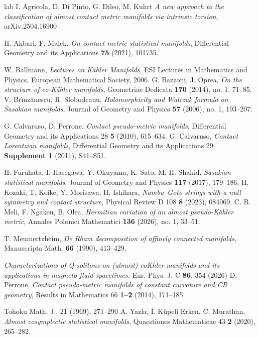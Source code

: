 \documentclass[12pt,a4paper,final]{amsart}
\numberwithin{equation}{section}
\theoremstyle{df}
\begin{document}
\begin{thebibliography}{lab}
{I. Agricola, D. Di Pinto, G. Dileo, M. Kuhrt}{ \emph{A new approach to the classification of almost contact metric manifolds via intrinsic torsion}},{
arXiv:2504.16900}



{H. Akbari, F. Malek},
{\emph{On contact metric statistical manifolds}},
{Differential Geometry and its Applications \textbf{75} (2021)},
{101735}.





{W. Ballmann},
{\emph{Lectures on K\"ahler Manifolds}},
{ESI Lectures in Mathematics and Physics, European Mathematical Society, 2006}.
{G. Bazzoni, J. Oprea},
{\emph{On the structure of co-K\"ahler manifolds}},
{Geometriae Dedicata \textbf{170} (2014), no. 1},
{71--85}.
{V. Br\^{\i}nz\u{a}nescu, R. Slobodeanu},
{\emph{Holomorphicity and Walczak formula on Sasakian manifolds}},
{Journal of Geometry and Physics \textbf{57} (2006), no. 1},
{193--207}.

{G. Calvaruso, D. Perrone},
{\emph{Contact pseudo-metric manifolds}},
{Differential Geometry and its Applications 28 \textbf{5} (2010), 615--634.}
{G. Calvaruso},
{\emph{Contact Lorentzian manifolds}},
{Differential Geometry and its Applications 29 \textbf{Supplement 1} (2011), S41--S51.}

{H. Furuhata, I. Hasegawa, Y. Okuyama, K. Sato, M. H. Shahid},
{\emph{Sasakian statistical manifolds}},
{Journal of Geometry and Physics \textbf{117} (2017)},
{179--186}.
{H. Kozaki, T. Koike, Y. Morisawa, H. Ishihara},
{\emph{Nambu--Goto strings with a null symmetry and contact structure}},
{Physical Review D 108 \textbf{8} (2023), 084069.}
{C. B. Meli, F. Ngakeu, B. Olea},
{\emph{Hermitian variation of an almost pseudo-K\"ahler metric}},
{Annales Polonici Mathematici \textbf{136} (2026), no. 1},
{33--51}.

T. Meumertzheim,
\emph{De Rham decomposition of affinely connected manifolds},
Manuscripta Math. \textbf{66} (1990), 413--429.

 {\emph{Characterizations of Q-solitons on (almost) coK\"hler manifolds and its applications in magneto-fluid spacetimes.}}{ Eur. Phys. J. C \textbf{86}, 354 (2026)}
{D. Perrone},
{\emph{Contact pseudo-metric manifolds of constant curvature and CR geometry}},
{Results in Mathematics 66 \textbf{1--2} (2014), 171--185.}

{Tohoku Math. J., 21 (1969), 271--290}
{A. Yazla, \.{I}. K\"upeli Erken, C. Murathan},
{\emph{Almost cosymplectic statistical manifolds}},
{Quaestiones Mathematicae 43 \textbf{2} (2020), 265--282}.





\end{thebibliography}
\end{document}
